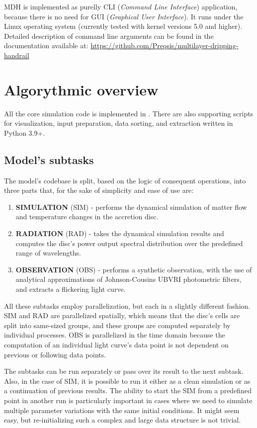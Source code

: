     MDH is implemented as purelly CLI (\emph{Command Line Interface}) application, because there is no need for GUI (\emph{Graphical User Interface}). It runs under the Linux operating system (currently tested with kernel versions 5.0 and higher). Detailed description of command line arguments can be found in the documentation available at: \url{https://github.com/Preqsis/multilayer-dripping-handrail}

\section{Algorythmic overview}
    All the core simulation code is implemented in \CC. There are also supporting scripts for visualization, input preparation, data sorting, and extraction written in Python 3.9+.  

\subsection{Model's subtasks}
    The model's codebase is split, based on the logic of consequent operations, into three parts that, for the sake of simplicity and ease of use are:

    \begin{enumerate}[topsep=4mm]
        \item \textbf{SIMULATION} (SIM) - performs the dynamical simulation of matter flow and temperature changes in the accretion disc.
        \item \textbf{RADIATION} (RAD) - takes the dynamical simulation results and computes the disc's power output spectral distribution over the predefined range of wavelengths.
        \item \textbf{OBSERVATION} (OBS) - performs a synthetic observation, with the use of analytical approximations of Johnson-Cousins $\mathrm{UBVRI}$ photometric filters, and extracts a flickering light curve.  
    \end{enumerate}

    All these subtasks employ parallelization, but each in a slightly different fashion. SIM and RAD are parallelized spatially, which means that the disc's cells are split into same-sized groups, and these groups are computed separately by individual processes. OBS is parallelized in the time domain because the computation of an individual light curve's data point is not dependent on previous or following data points. 

    The subtasks can be run separately or pass over its result to the next subtask. Also, in the case of SIM, it is possible to run it either as a clean simulation or as a continuation of previous results. The ability to start the SIM from a predefined point in another run is particularly important in cases where we need to simulate multiple parameter variations with the same initial conditions. It might seem easy, but re-initializing such a complex and large data structure is not trivial. 

